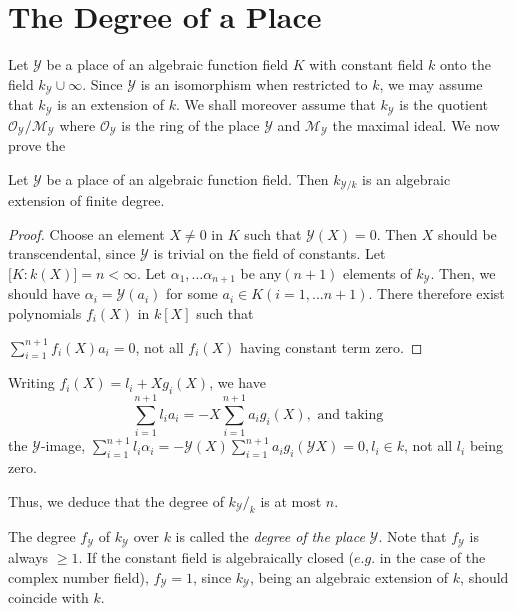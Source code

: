 \section{The Degree of a Place} \label{chap4:sec7}%

Let $\mathscr{Y}$ be a place of an algebraic function field $K$ with
constant field $k$ onto the field $k_{\mathscr{Y}} \cup \infty$. Since
$\mathscr{Y}$ is an isomorphism when restricted to $k$, we may assume
that $k_\mathscr{Y}$ is an extension of $k$. We shall moreover assume
that $k_\mathscr{Y}$ is the quotient
$\mathscr{O}_\mathscr{Y}/\mathscr{M}_\mathscr{Y}$ where
$\mathscr{O}_\mathscr{Y}$ is the ring of the place $\mathscr{Y}$ and
$\mathscr{M}_\mathscr{Y}$ the maximal ideal. We now prove the 
\begin{theorem*}
  Let $\mathscr{Y}$ be a place of an algebraic function field. Then
  $k_{\mathscr{Y}/k}$ is an algebraic extension of finite degree. 
\end{theorem*}

\begin{proof}
  Choose an element $X \neq 0$ in $K$ such that $\mathscr{Y} (X) =
  0$. Then $X$ should be transcendental, since $\mathscr{Y}$ is
  trivial on the field of constants. Let $\bigg[K : k(X)\bigg] =n <
  \infty$. Let $\alpha_1,\ldots \alpha_{n+1}$ be any\pageoriginale $(n+1)$ elements
  of $k_\mathscr{Y}$. Then, we should have $\alpha_i = \mathscr{Y}
  (a_i)$ for some $a_i \in K(i =1, \ldots n+1)$. There therefore exist
  polynomials $f_i(X)$ in $k[X]$ such that 

  $\sum \limits^{n+1}_{i=1}f_i(X) a_i = 0$, not all $f_i(X)$ having
  constant term zero. 
\end{proof}

Writing $f_i(X)=l_i + Xg_i (X)$, we have
$$
\sum^{n+1}_{i=1} l_i a_i = -X \sum^{n+1}_{i=1} a_i g_i(X), \text{ and taking }
$$
the $\mathscr{Y}$-image, $\sum \limits^{n+1}_{i=1} l_i \alpha_i =
-\mathscr{Y} (X) \sum \limits^{n+1}_{i=1} a_i g_i (\mathscr{Y}X) = 0,
l_i \in k$, not all $l_i$ being zero. 

Thus, we deduce that the degree of $ k_\mathscr{Y}/_k$ is at most $n$.

The degree $f_\mathscr{Y}$ of $k_\mathscr{Y}$ over $k$ is called the
\textit{degree of the place} $\mathscr{Y}$. Note that $f_\mathscr{Y}$
is always $\geq 1$. If the constant field is algebraically closed
($e.g$. in the case of the complex number field), $f_\mathscr{Y} = 1$,
since $k_\mathscr{Y}$, being an algebraic extension of $k$, should
coincide with $k$. 

